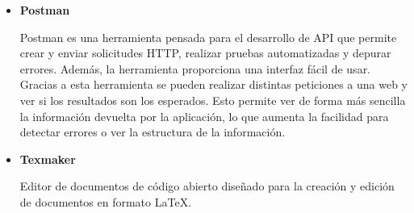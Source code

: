 \begin{itemize}
\item\textbf{Postman}

Postman es una herramienta pensada para el desarrollo de API que permite crear y enviar solicitudes HTTP, realizar pruebas automatizadas y depurar errores.
Además, la herramienta proporciona una interfaz fácil de usar.
Gracias a esta herramienta se pueden realizar distintas peticiones a una web y ver si los resultados son los esperados.
Esto permite ver de forma más sencilla la información devuelta por la aplicación, lo que aumenta la facilidad para detectar errores o ver la estructura de la información.

\item\textbf{Texmaker}

Editor de documentos de código abierto diseñado para la creación y edición de documentos en formato LaTeX.

\end{itemize}
\subsection{}
